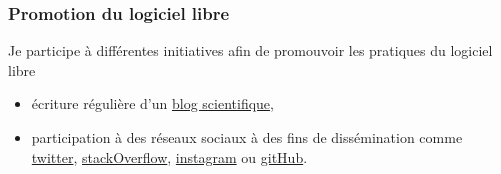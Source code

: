 \documentclass[10pt,french,a4paper,twoside]{article}%
\begin{document}

\subsubsection{Promotion du logiciel libre} %
Je participe à différentes initiatives afin de promouvoir les pratiques du logiciel libre
\begin{itemize}
	\item écriture régulière d'un \href{https://laurentperrinet.github.io/sciblog/}{blog scientifique},
	\item participation à des réseaux sociaux à des fins de dissémination comme \href{https://twitter.com/laurentperrinet}{twitter}, \href{https://stackoverflow.com/users/234547/meduz}{stackOverflow}, \href{https://www.instagram.com/laurentperrinet/}{instagram} ou \href{https://github.com/laurentperrinet}{gitHub}.
\end{itemize}
\end{document}
